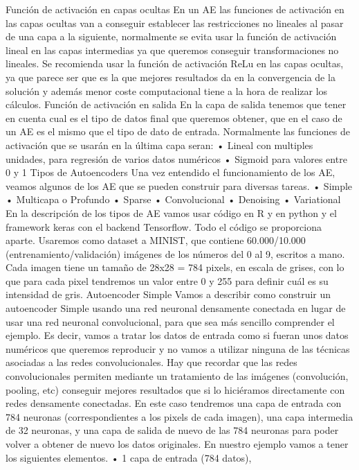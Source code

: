 \documentclass[
  a4paper,
  DIV=11,
  numbers=noendperiod]{scrreprt}
\begin{document}
Función de activación en capas ocultas En un AE las funciones de
activación en las capas ocultas van a conseguir establecer las
restricciones no lineales al pasar de una capa a la siguiente,
normalmente se evita usar la función de activación lineal en las capas
intermedias ya que queremos conseguir transformaciones no lineales. Se
recomienda usar la función de activación ReLu en las capas ocultas, ya
que parece ser que es la que mejores resultados da en la convergencia de
la solución y además menor coste computacional tiene a la hora de
realizar los cálculos. Función de activación en salida En la capa de
salida tenemos que tener en cuenta cual es el tipo de datos final que
queremos obtener, que en el caso de un AE es el mismo que el tipo de
dato de entrada. Normalmente las funciones de activación que se usarán
en la última capa seran: • Lineal con multiples unidades, para regresión
de varios datos numéricos • Sigmoid para valores entre 0 y 1 Tipos de
Autoencoders Una vez entendido el funcionamiento de los AE, veamos
algunos de los AE que se pueden construir para diversas tareas. • Simple
• Multicapa o Profundo • Sparse • Convolucional • Denoising •
Variational En la descripción de los tipos de AE vamos usar código en R
y en python y el framework keras con el backend Tensorflow. Todo el
código se proporciona aparte. Usaremos como dataset a MINIST, que
contiene 60.000/10.000 (entrenamiento/validación) imágenes de los
números del 0 al 9, escritos a mano. Cada imagen tiene un tamaño de
28x28 = 784 pixels, en escala de grises, con lo que para cada pixel
tendremos un valor entre 0 y 255 para definir cuál es su intensidad de
gris. Autoencoder Simple Vamos a describir como construir un autoencoder
Simple usando una red neuronal densamente conectada en lugar de usar una
red neuronal convolucional, para que sea más sencillo comprender el
ejemplo. Es decir, vamos a tratar los datos de entrada como si fueran
unos datos numéricos que queremos reproducir y no vamos a utilizar
ninguna de las técnicas asociadas a las redes convolucionales. Hay que
recordar que las redes convolucionales permiten mediante un tratamiento
de las imágenes (convolución, pooling, etc) conseguir mejores resultados
que si lo hiciéramos directamente con redes densamente conectadas. En
este caso tendremos una capa de entrada con 784 neuronas
(correspondientes a los pixels de cada imagen), una capa intermedia de
32 neuronas, y una capa de salida de nuevo de las 784 neuronas para
poder volver a obtener de nuevo los datos originales. En nuestro ejemplo
vamos a tener los siguientes elementos. • 1 capa de entrada (784 datos),
\end{document}
